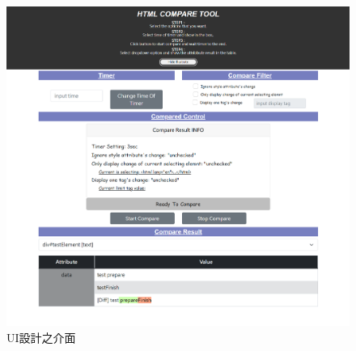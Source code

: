 \begin{figure}[H]
    \centering
    \includegraphics[width=1\textwidth]{picture/ch3-UIUX-example.png}
    \caption{UI設計之介面}
    \label{f3.5}
\end{figure}